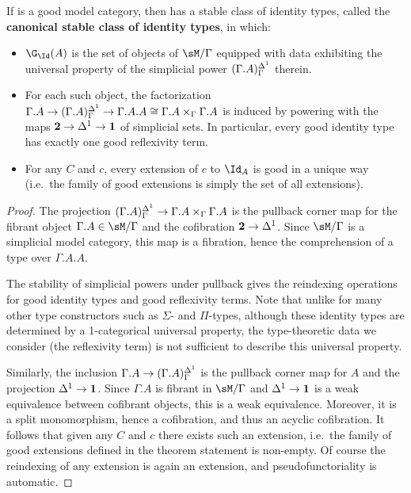 \begin{thm}\label{thm:stable-id}
  If \sM is a good model category, then \fibm has a stable class of identity types, called the \textbf{canonical stable class of identity types}, in which:
  \begin{itemize}
  \item $\G_\Id(A)$ is the set of objects of $\sM/\Gamma$ equipped with data exhibiting the universal property of the simplicial power $(\Gamma.A)^{\Delta^1}_\Gamma$ therein.
  \item For each such object, the factorization $\Gamma.A \to (\Gamma.A)^{\Delta^1}_\Gamma \to \Gamma.A.A \cong \Gamma.A \times_\Gamma \Gamma.A$ is induced by powering with the maps $\mathbf{2} \to {\Delta^1} \to \mathbf{1}$ of simplicial sets.
    In particular, every good identity type has exactly one good reflexivity term.
  \item For any $C$ and $c$, every extension of $c$ to $\Id_A$ is good in a unique way (i.e.\ the family of good extensions is simply the set of all extensions).
  \end{itemize}
\end{thm}
\begin{proof}
  The projection $(\Gamma.A)^{\Delta^1}_\Gamma \to \Gamma.A\times_\Gamma \Gamma.A$ is the pullback corner map for the fibrant object $\Gamma.A\in\sM/\Gamma$ and the cofibration $\mathbf{2}\to {\Delta^1}$.
  Since $\sM/\Gamma$ is a simplicial model category, this map is a fibration, hence the comprehension of a type over $\Gamma.A.A$.

  The stability of simplicial powers under pullback gives the reindexing operations for good identity types and good reflexivity terms.
  Note that unlike for many other type constructors such as $\Sigma$- and $\Pi$-types, although these identity types are determined by a 1-categorical universal property, the type-theoretic data we consider (the reflexivity term) is not sufficient to describe this universal property.

  Similarly, the inclusion $\Gamma.A\to (\Gamma.A)^{\Delta^1}_\Gamma$ is the pullback corner map for $A$ and the projection ${\Delta^1} \to \mathbf{1}$.
  Since $\Gamma.A$ is fibrant in $\sM/\Gamma$ and ${\Delta^1} \to \mathbf{1}$ is a weak equivalence between cofibrant objects, this is a weak equivalence.
  Moreover, it is a split monomorphism, hence a cofibration, and thus an acyclic cofibration.
  It follows that given any $C$ and $c$ there exists such an extension, i.e.\ the family of good extensions defined in the theorem statement is non-empty.
  Of course the reindexing of any extension is again an extension, and pseudofunctoriality is automatic.
\end{proof}

